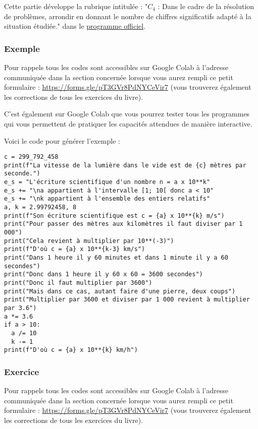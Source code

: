 \documentclass[a4paper, 11pt, twoside]{article}
\begin{document}
\startcontents[level-2]

Cette partie développe la rubrique intitulée : "\(C_4\) : Dans le
cadre de la résolution de problèmes, arrondir en donnant le nombre
de chiffres significatifs adapté à la situation étudiée." dans le
\href{https://eduscol.education.fr/document/24553/download}{programme officiel}.

\subsubsection{Exemple}
\label{sec:org359b460}
Pour rappels tous les codes sont accessibles sur Google Colab à
l'adresse communiquée dans la section concernée lorsque vous
aurez rempli ce petit formulaire :
\url{https://forms.gle/pT3GVr8PdNYCeVir7} (vous trouverez également
les corrections de tous les exercices du livre).

C'est également sur Google Colab que vous pourrez tester tous les
programmes qui vous permettent de pratiquer les capacités attendues
de manière interactive.

Voici le code pour générer l'exemple :
\begin{verbatim}
c = 299_792_458
print(f"La vitesse de la lumière dans le vide est de {c} mètres par seconde.")
e_s = "L'écriture scientifique d'un nombre n = a x 10**k"
e_s += "\na appartient à l'intervalle [1; 10[ donc a < 10"
e_s += "\nk appartient à l'ensemble des entiers relatifs"
a, k = 2.99792458, 8
print(f"Son écriture scientifique est c = {a} x 10**{k} m/s")
print("Pour passer des mètres aux kilomètres il faut diviser par 1 000")
print("Cela revient à multiplier par 10**(-3)")
print(f"D'où c = {a} x 10**{k-3} km/s")
print("Dans 1 heure il y 60 minutes et dans 1 minute il y a 60 secondes")
print("Donc dans 1 heure il y 60 x 60 = 3600 secondes")
print("Donc il faut multiplier par 3600")
print("Mais dans ce cas, autant faire d'une pierre, deux coups")
print("Multiplier par 3600 et diviser par 1 000 revient à multiplier par 3.6")
a *= 3.6
if a > 10:
  a /= 10
  k -= 1
print(f"D'où c = {a} x 10**{k} km/h")
\end{verbatim}

\subsubsection{Exercice}
\label{sec:orgf2086dc}
Pour rappels tous les codes sont accessibles sur Google Colab à
l'adresse communiquée dans la section concernée lorsque vous
aurez rempli ce petit formulaire :
\url{https://forms.gle/pT3GVr8PdNYCeVir7} (vous trouverez également
les corrections de tous les exercices du livre).
\end{document}
